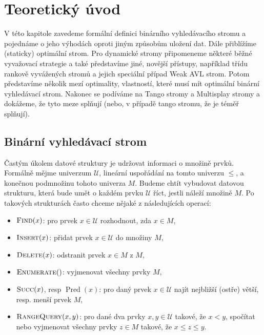 \def\maybetext{\ifmmode\noexpand\hbox\fi}
\def\ope#1{\maybetext{{\sc#1}}}

\chapter{Teoretický úvod}

V této kapitole zavedeme formální definici binárního vyhledávacího stromu a
pojednáme o jeho výhodách oproti jiným způsobům uložení dat. Dále přiblížíme
(staticky) optimální strom. Pro dynamické stromy připomeneme některé běžné
vyvažovací strategie a také představíme jiné, novější přístupy, například třídu
rankově vyvážených stromů a jejich speciální případ Weak AVL strom. Potom
představíme několik mezí optimality, vlastností, které musí mít optimální
binární vyhledávací strom. Nakonec se podíváme na Tango stromy a Multisplay
stromy a dokážeme, že tyto meze splňují (nebo, v případě tango stromu, že je
téměř splňují).

\section{Binární vyhledávací strom}
\def\U{\mathcal U}
\def\o{\mathcal O}
\let\op\operatorname

Častým úkolem datové struktury je udržovat informaci o množině prvků. Formálně
mějme univerzum $\mathcal U$, lineární uspořádání na tomto univerzu $\leq$, a
konečnou podmnožinu tohoto univerza $M$. Budeme chtít vybudovat datovou strukturu, která bude umět o
každém prvku $\mathcal U$ říct, jestli náleží množině $M$. Po takových
strukturách často chceme nějaké z následujících operací:

\begin{itemize}
\item $\ope{Find}(x)$: pro prvek $x \in \U$ rozhodnout, zda $x\in M$,
\item $\ope{Insert}(x)$: přidat prvek $x \in \U$ do množiny $M$,
\item $\ope{Delete}(x)$: odstranit prvek $x\in M$ z $M$,
\item $\ope{Enumerate}()$: vyjmenovat všechny prvky $M$,
\item $\ope{Succ}(x)$, resp $\op{Pred}(x)$: pro daný prvek $x\in \U $ najít nejbližší (ostře) větší, resp. menší prvek $M$,
\item $\ope{RangeQuery}(x,y)$: pro dané dva prvky $x,y\in\U$ takové, že $x<y$, spočítat nebo vyjmenovat všechny prvky $z\in M$ takové, že $x \leq z \leq y$.
\end{itemize}

